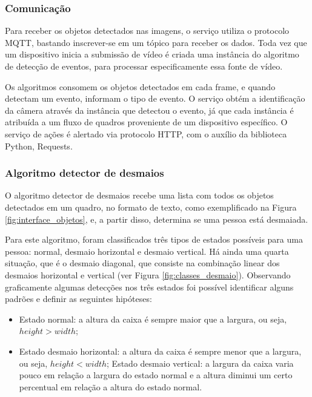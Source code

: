 \documentclass[]{politex}
\begin{document}
\subsubsection{Comunicação}
Para receber os objetos detectados nas imagens, o serviço utiliza o protocolo MQTT, bastando inscrever-se em um tópico para receber os dados. Toda vez que um dispositivo inicia a submissão de vídeo é criada uma instância do algoritmo de detecção de eventos, para processar especificamente essa fonte de vídeo.

Os algoritmos consomem os objetos detectados em cada frame, e quando detectam um evento, informam o tipo de evento. O serviço obtém a identificação da câmera através da instância que detectou o evento, já que cada instância é atribuída a um fluxo de quadros proveniente de um dispositivo específico. O serviço de ações é alertado via protocolo HTTP, com o auxílio da biblioteca Python, Requests.

\subsubsection{Algoritmo detector de desmaios}
O algoritmo detector de desmaios recebe uma lista com todos os objetos detectados em um quadro, no formato de texto, como exemplificado na Figura \ref{fig:interface_objetos}, e, a partir disso, determina se uma pessoa está desmaiada.

Para este algoritmo, foram classificados três tipos de estados possíveis para uma pessoa: normal, desmaio horizontal e desmaio vertical. Há ainda uma quarta situação, que é o desmaio diagonal, que consiste na combinação linear dos desmaios horizontal e vertical (ver Figura \ref{fig:classes_desmaio}). Observando graficamente algumas detecções nos três estados foi possível identificar alguns padrões e definir as seguintes hipóteses:

\begin{itemize}
    \item Estado normal: a altura da caixa é sempre maior que a largura, ou seja, \(height>width\);
    \item Estado desmaio horizontal: a altura da caixa é sempre menor que a largura, ou seja, \(height<width\);
    Estado desmaio vertical: a largura da caixa varia pouco em relação a largura do estado normal e a altura diminui um certo percentual em relação a altura do estado normal.
\end{itemize}
\end{document}
